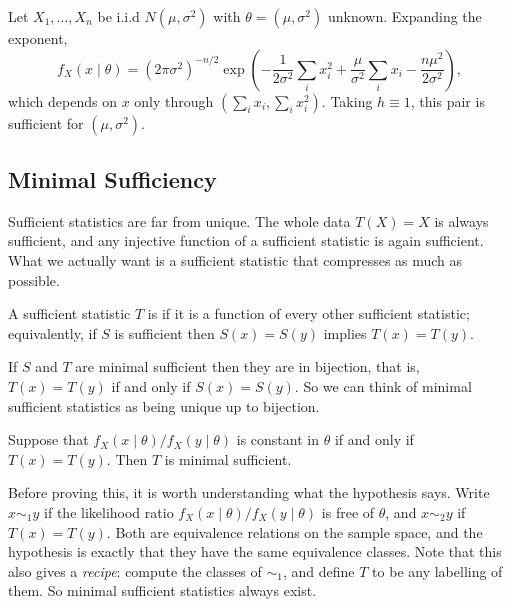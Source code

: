 \begin{example}
  Let $X_1, \dots, X_n$ be i.i.d $N(\mu, \sigma^2)$ with $\theta = (\mu, \sigma^2)$ unknown. Expanding the exponent,
  $$
  f_X(x \mid \theta) = (2\pi\sigma^2)^{-n/2}\exp\left(-\frac{1}{2\sigma^2}\sum_i x_i^2 + \frac{\mu}{\sigma^2}\sum_i x_i - \frac{n\mu^2}{2\sigma^2}\right),
  $$
  which depends on $x$ only through $\left(\sum_i x_i, \sum_i x_i^2\right)$. Taking $h \equiv 1$, this pair is sufficient for $(\mu,\sigma^2)$.
\end{example}

\subsection{Minimal Sufficiency}

Sufficient statistics are far from unique. The whole data $T(X) = X$ is always sufficient, and any injective function of a sufficient statistic is again sufficient. What we actually want is a sufficient statistic that compresses as much as possible.

\begin{definition}
  A sufficient statistic $T$ is  if it is a function of every other sufficient statistic; equivalently, if $S$ is sufficient then $S(x) = S(y)$ implies $T(x) = T(y)$.
\end{definition}

\begin{remark}
  If $S$ and $T$ are minimal sufficient then they are in bijection, that is, $T(x) = T(y)$ if and only if $S(x) = S(y)$.
  So we can think of minimal sufficient statistics as being unique up to bijection.
\end{remark}

\begin{theorem}
  Suppose that $f_X(x \mid \theta ) / f_X(y \mid \theta)$ is constant in $\theta$ if and only if $T(x) = T(y)$. Then $T$ is minimal sufficient.
\end{theorem}

Before proving this, it is worth understanding what the hypothesis says. Write $x \sim_1 y$ if the likelihood ratio $f_X(x\mid\theta)/f_X(y\mid\theta)$ is free of $\theta$, and $x \sim_2 y$ if $T(x) = T(y)$. Both are equivalence relations on the sample space, and the hypothesis is exactly that they have the same equivalence classes. Note that this also gives a \emph{recipe}: compute the classes of $\sim_1$, and define $T$ to be any labelling of them. So minimal sufficient statistics always exist.


